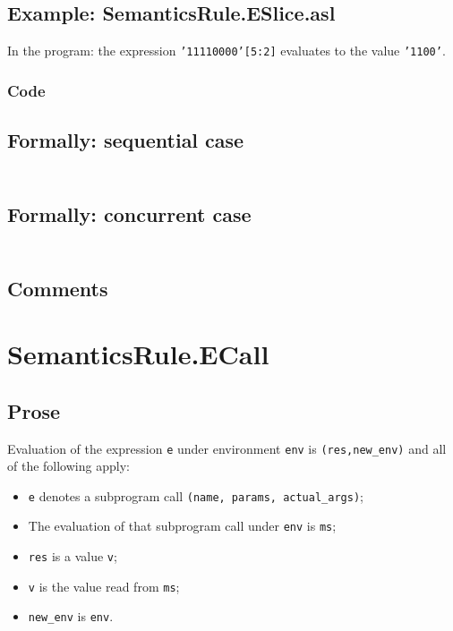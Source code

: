\documentclass{book}
\begin{document}
  \subsection{Example: SemanticsRule.ESlice.asl}
    In the program:
    the expression \texttt{'11110000'[5:2]} evaluates to the value \texttt{'1100'}.

  \subsubsection{Code}

  \subsection{Formally: sequential case}
  \begin{align}
  \end{align} 

  \subsection{Formally: concurrent case}
  \begin{align}
  \end{align} 

  \subsection{Comments}

\section{SemanticsRule.ECall \label{sec:SemanticsRule.ECall}}

  \subsection{Prose}

  Evaluation of the expression \texttt{e} under environment \texttt{env} is
  \texttt{(res,new\_env)} and all of the following apply:
  \begin{itemize}
  \item \texttt{e} denotes a subprogram call \texttt{(name, params, actual\_args)};
  \item The evaluation of that subprogram call under \texttt{env} is \texttt{ms};
  \item \texttt{res} is a value \texttt{v};
  \item \texttt{v} is the value read from \texttt{ms};
  \item \texttt{new\_env} is \texttt{env}.
  \end{itemize}
\end{document}
